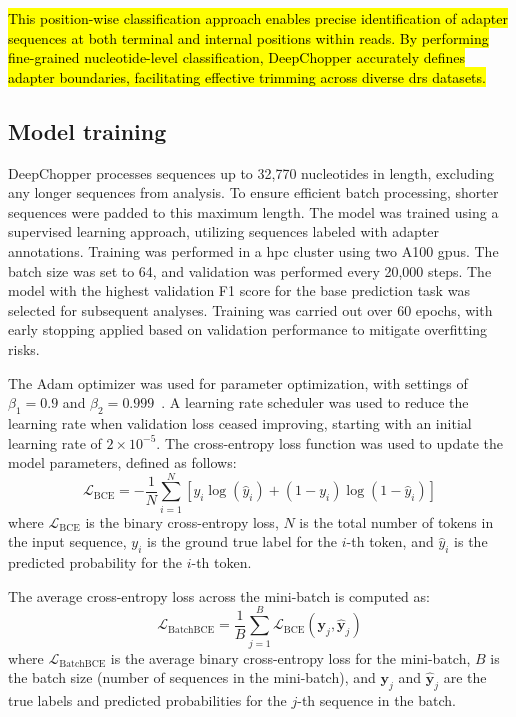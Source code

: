 \documentclass[pdflatex,sn-nature, lineno]{sn-jnl}%
\begin{document}
\hl{This position-wise classification approach enables precise identification of adapter sequences at both terminal and internal positions within reads. By performing fine-grained nucleotide-level classification, DeepChopper accurately defines adapter boundaries, facilitating effective trimming across diverse \mbox{\gls{drs}} datasets.}

\subsection{Model training}\label{ssec:training}


DeepChopper processes sequences up to 32,770 nucleotides in length, excluding any longer sequences from analysis.
To ensure efficient batch processing, shorter sequences were padded to this maximum length.
The model was trained using a supervised learning approach, utilizing sequences labeled with adapter annotations.
Training was performed in a \gls{hpc} cluster using two A100 \glspl{gpu}.
The batch size was set to 64, and validation was performed every 20,000 steps.
The model with the highest validation F1 score for the base prediction task was selected for subsequent analyses.
Training was carried out over \num{60} epochs, with early stopping applied based on validation performance to mitigate overfitting risks.

The Adam optimizer was used for parameter optimization, with settings of \(\beta_{1} = 0.9 \) and \(\beta_{2} = 0.999 \)~\cite{kingma2014adam}.
A learning rate scheduler was used to reduce the learning rate when validation loss ceased improving, starting with an initial learning rate of \(2 \times 10^{-5} \).
The cross-entropy loss function was used to update the model parameters, defined as follows:
\[
	\mathcal{L}_{\textrm{BCE}} = -\frac{1}{N} \sum_{i=1}^{N} [y_i \log(\hat{y}_i) + (1 - y_i) \log(1 - \hat{y}_i)]
\]
where \(\mathcal{L}_{\textrm{BCE}}\) is the binary cross-entropy loss, \(N\) is the total number of tokens in the input sequence, \(y_i\) is the ground true label for the \(i\)-th token, and \(\hat{y}_i\) is the predicted probability for the \(i\)-th token.

The average cross-entropy loss across the mini-batch is computed as:
\[
	\mathcal{L}_{\textrm{BatchBCE}} = \frac{1}{B} \sum_{j=1}^{B} \mathcal{L}_{\textrm{BCE}}(\mathbf{y}_j, \hat{\mathbf{y}}_j)
\]
where \(\mathcal{L}_{\textrm{BatchBCE}}\) is the average binary cross-entropy loss for the mini-batch, \(B\) is the batch size (number of sequences in the mini-batch),  and \(\mathbf{y}_j\) and \(\hat{\mathbf{y}}_j\) are the true labels and predicted probabilities for the \(j\)-th sequence in the batch.
\end{document}
